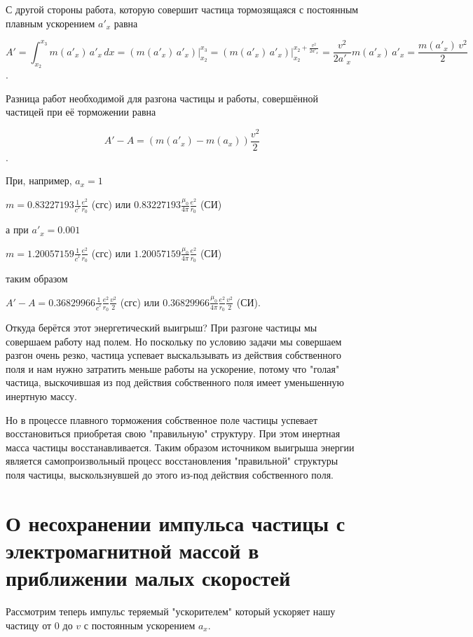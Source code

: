 \documentclass{article}
\begin{document}
С другой стороны работа, которую совершит частица тормозящаяся с постоянным плавным ускорением $a'_x$ равна

\[A' = \int_{x_2}^{x_3} m(a'_x) \, a'_x \, dx = \left(m(a'_x) \, a'_x\right)\Bigg|_{x_2}^{x_3} = \left(m(a'_x) \, a'_x\right)\Bigg|_{x_2}^{x_2 + \frac{v^2}{2a'_x}} = \frac{v^2}{2a'_x} m(a'_x) \, a'_x = \frac{m(a'_x) \, v^2}{2}\].

Разница работ необходимой для разгона частицы и работы, совершённой частицей при её торможении равна


\[A' - A  = \left(m(a'_x) - m(a_x)\right)\frac{v^2}{2}\].

При, например, $a_x=1$

$m = 0.83227193\frac{1}{{{c}^{^{2}}}}\frac{e^2}{{{r}_{0}}}$ (сгс) или
$0.83227193\frac{{{\mu }_{0}}}{4\pi }\frac{e^2}{{{r}_{0}}}$ (СИ)

а при $a'_x=0.001$

$m = 1.20057159\frac{1}{{{c}^{^{2}}}}\frac{e^2}{{{r}_{0}}}$ (сгс) или
$1.20057159\frac{{{\mu }_{0}}}{4\pi }\frac{e^2}{{{r}_{0}}}$ (СИ)

таким образом

$A' - A  = 0.36829966\frac{1}{{{c}^{^{2}}}}\frac{e^2}{{{r}_{0}}}\frac{v^2}{2}$  (сгс) или
$0.36829966\frac{{{\mu }_{0}}}{4\pi }\frac{e^2}{{{r}_{0}}}\frac{v^2}{2}$  (СИ).

Откуда берётся этот энергетический выигрыш? При разгоне частицы мы совершаем работу над полем. Но поскольку по условию задачи мы совершаем разгон очень резко, частица успевает выскальзывать из действия собственного поля и нам нужно затратить меньше работы на ускорение, потому что "голая" частица, выскочившая из под действия собственного поля имеет уменьшенную инертную массу.

Но в процессе плавного торможения собственное поле частицы успевает восстановиться приобретая свою "правильную" структуру. При этом инертная масса частицы восстанавливается. Таким образом источником выигрыша энергии является самопроизвольный процесс восстановления "правильной" структуры поля частицы, выскользнувшей до этого из-под действия собственного поля.


\section{О несохранении импульса частицы с электромагнитной массой в приближении малых скоростей}

Рассмотрим теперь импульс теряемый "ускорителем" который ускоряет нашу частицу от $0$ до $v$ с постоянным ускорением $a_x$.
\end{document}
